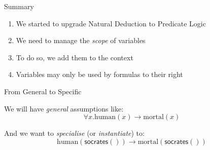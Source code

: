 \documentclass[xetex,aspectratio=169,14pt,hyperref={pdfpagelabels=true,pdflang={en-GB}}]{beamer}
\begin{document}
\begin{frame}
  {Summary}

  \begin{enumerate}
  \item We started to upgrade Natural Deduction to Predicate Logic
  \item We need to manage the \emph{scope} of variables
  \item To do so, we add them to the context
  \item Variables may only be used by formulas to their right
  \end{enumerate}
\end{frame}








\begin{frame}
  {From General to Specific}

  We will have \emph{general} assumptions like:
  \begin{displaymath}
    \forall x. \mathrm{human}(x) \to \mathrm{mortal}(x)
  \end{displaymath}

  \bigskip

  And we want to \emph{specialise} (or \emph{instantiate}) to:
  \begin{displaymath}
    \mathrm{human}(\mathsf{socrates}()) \to \mathrm{mortal}(\mathsf{socrates}())
  \end{displaymath}
\end{frame}
\end{document}
